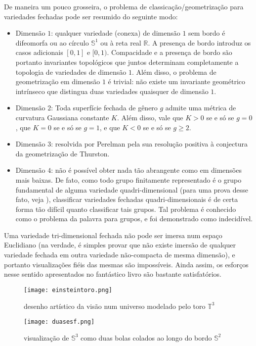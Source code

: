 De maneira um pouco grosseira, o problema de classicação/geometrização para variedades fechadas pode ser resumido do seguinte modo: 
\begin{itemize}
\item  Dimensão $1$: qualquer variedade (conexa) de dimensão $1$ sem bordo é difeomorfa ou ao círculo $\mathbb{S}^1$ ou à reta real $\mathbb{R}$. A presença de bordo introduz os casos adicionais $[0, 1]$ e $[0, 1)$. Compacidade e a presença de bordo são portanto invariantes topológicos que juntos determinam completamente a topologia de variedades de dimensão $1$. Além disso, o problema de geometrização em dimensão $1$ é trivial: não existe um invariante geométrico intrínseco que distingua duas variedades quaisquer de dimensão $1$. 
\item Dimensão $2$: Toda superfície fechada de gênero $g$ admite uma métrica de curvatura Gaussiana constante $K$. Além disso, vale que $K > 0$ se e só se $g = 0$, que $K = 0$ se e só se $g = 1$, e que $K < 0$ se e só se $g \geq 2$. 
\item Dimensão $3$: resolvida por Perelman pela sua resolução positiva à conjectura da geometrização de Thurston.
\item Dimensão $4$: não é possível obter nada tão abrangente como em dimensões mais baixas. De fato, como todo grupo finitamente representado é o grupo fundamental de alguma variedade quadri-dimensional (para uma prova desse fato, veja ), classificar variedades fechadas quadri-dimensionais é de certa forma tão difícil quanto classificar tais grupos. Tal problema é conhecido como o problema da palavra para grupos, e foi demonstrado como indecidível. 
\end{itemize}
Uma variedade tri-dimensional fechada não pode ser imersa num espaço Euclidiano (na verdade, é simples provar que não existe imersão de qualquer variedade fechada em outra variedade não-compacta de mesma dimensão), e portanto visualizações fiéis das mesmas são impossíveis. Ainda assim, os esforços nesse sentido apresentados no fantástico livro  são bastante satisfatórios. 
\iffalse
\begin{figure}[H]
\centering
\texttt{[image: einsteintoro.png]}
\caption{desenho artístico da visão num universo modelado pelo toro $\mathbb{T}^3$}
\end{figure}

\begin{figure}[H]
\centering
\texttt{[image: duasesf.png]}
\caption{visualização de $\mathbb{S}^3$ como duas bolas colados ao longo do bordo $\mathbb{S}^2$}
\end{figure}


